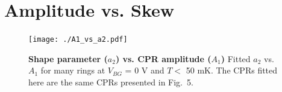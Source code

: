 \documentclass[11pt]{article}
\begin{document}
\FloatBarrier
\section{Amplitude vs. Skew}

\begin{figure}[htb]
	\centerline{\texttt{[image: ./A1\_vs\_a2.pdf]}}
\caption[Shape parameter ($a_2$) vs. CPR amplitude ($A_1$)]{\label{fig:A1_vs_a2} \textbf{Shape parameter ($a_2$) vs. CPR amplitude ($A_1$)} Fitted $a_2$ vs. $A_1$ for many rings at $V_{BG}$ = 0 V and $T  <$ 50 mK. The CPRs fitted here are the same CPRs presented in Fig.~5.}
\end{figure}


\FloatBarrier
{}
\end{document}
